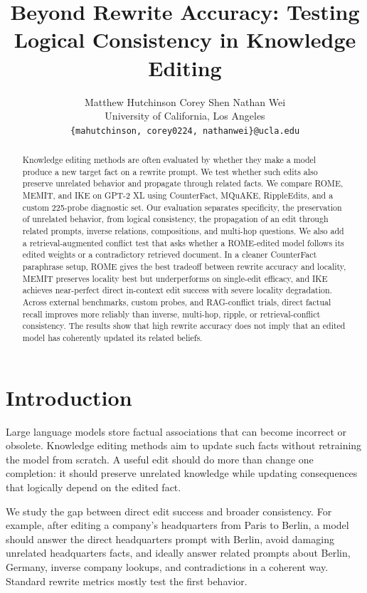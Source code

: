 \documentclass[11pt]{article}
\title{Beyond Rewrite Accuracy: Testing Logical Consistency in Knowledge Editing}
\author{
  Matthew Hutchinson \quad Corey Shen \quad Nathan Wei \\
  University of California, Los Angeles \\
  \texttt{\{mahutchinson, corey0224, nathanwei\}@ucla.edu}
}
\begin{document}
\maketitle

\begin{abstract}
Knowledge editing methods are often evaluated by whether they make a model produce a new target fact on a rewrite prompt. We test whether such edits also preserve unrelated behavior and propagate through related facts. We compare ROME, MEMIT, and IKE on GPT-2 XL using CounterFact, MQuAKE, RippleEdits, and a custom 225-probe diagnostic set. Our evaluation separates specificity, the preservation of unrelated behavior, from logical consistency, the propagation of an edit through related prompts, inverse relations, compositions, and multi-hop questions. We also add a retrieval-augmented conflict test that asks whether a ROME-edited model follows its edited weights or a contradictory retrieved document. In a cleaner CounterFact paraphrase setup, ROME gives the best tradeoff between rewrite accuracy and locality, MEMIT preserves locality best but underperforms on single-edit efficacy, and IKE achieves near-perfect direct in-context edit success with severe locality degradation. Across external benchmarks, custom probes, and RAG-conflict trials, direct factual recall improves more reliably than inverse, multi-hop, ripple, or retrieval-conflict consistency. The results show that high rewrite accuracy does not imply that an edited model has coherently updated its related beliefs.
\end{abstract}

\section{Introduction}

Large language models store factual associations that can become incorrect or obsolete. Knowledge editing methods aim to update such facts without retraining the model from scratch. A useful edit should do more than change one completion: it should preserve unrelated knowledge while updating consequences that logically depend on the edited fact.

We study the gap between direct edit success and broader consistency. For example, after editing a company's headquarters from Paris to Berlin, a model should answer the direct headquarters prompt with Berlin, avoid damaging unrelated headquarters facts, and ideally answer related prompts about Berlin, Germany, inverse company lookups, and contradictions in a coherent way. Standard rewrite metrics mostly test the first behavior.
\end{document}
